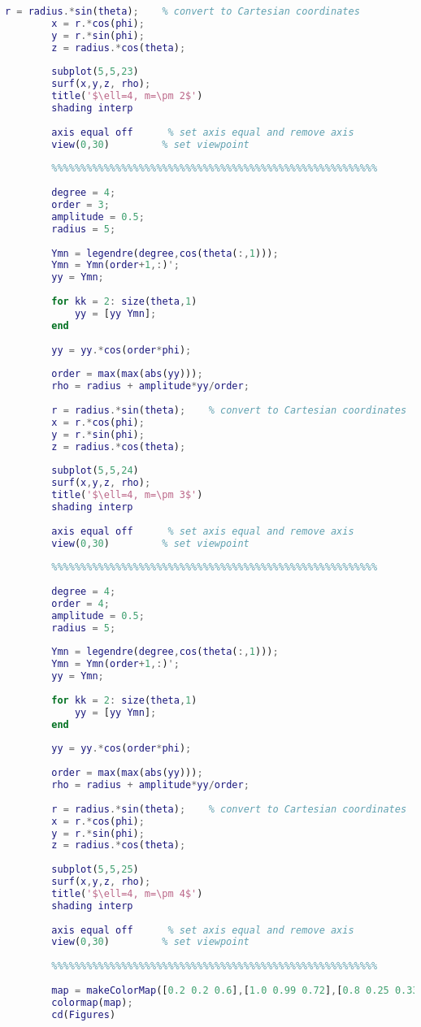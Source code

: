 \begin{lstlisting}[language=MATLAB]
		r = radius.*sin(theta);    % convert to Cartesian coordinates
		x = r.*cos(phi);
		y = r.*sin(phi);
		z = radius.*cos(theta);
		
		subplot(5,5,23)
		surf(x,y,z, rho);
		title('$\ell=4, m=\pm 2$')
		shading interp
		
		axis equal off      % set axis equal and remove axis
		view(0,30)         % set viewpoint
		
		%%%%%%%%%%%%%%%%%%%%%%%%%%%%%%%%%%%%%%%%%%%%%%%%%%%%%%%%
		
		degree = 4;
		order = 3;
		amplitude = 0.5;
		radius = 5;
		
		Ymn = legendre(degree,cos(theta(:,1)));
		Ymn = Ymn(order+1,:)';
		yy = Ymn;
		
		for kk = 2: size(theta,1)
		    yy = [yy Ymn];
		end
		
		yy = yy.*cos(order*phi);
		
		order = max(max(abs(yy)));
		rho = radius + amplitude*yy/order;
		
		r = radius.*sin(theta);    % convert to Cartesian coordinates
		x = r.*cos(phi);
		y = r.*sin(phi);
		z = radius.*cos(theta);
		
		subplot(5,5,24)
		surf(x,y,z, rho);
		title('$\ell=4, m=\pm 3$')
		shading interp
		
		axis equal off      % set axis equal and remove axis
		view(0,30)         % set viewpoint
		
		%%%%%%%%%%%%%%%%%%%%%%%%%%%%%%%%%%%%%%%%%%%%%%%%%%%%%%%%
		
		degree = 4;
		order = 4;
		amplitude = 0.5;
		radius = 5;
		
		Ymn = legendre(degree,cos(theta(:,1)));
		Ymn = Ymn(order+1,:)';
		yy = Ymn;
		
		for kk = 2: size(theta,1)
		    yy = [yy Ymn];
		end
		
		yy = yy.*cos(order*phi);
		
		order = max(max(abs(yy)));
		rho = radius + amplitude*yy/order;
		
		r = radius.*sin(theta);    % convert to Cartesian coordinates
		x = r.*cos(phi);
		y = r.*sin(phi);
		z = radius.*cos(theta);
		
		subplot(5,5,25)
		surf(x,y,z, rho);
		title('$\ell=4, m=\pm 4$')
		shading interp
		
		axis equal off      % set axis equal and remove axis
		view(0,30)         % set viewpoint
		
		%%%%%%%%%%%%%%%%%%%%%%%%%%%%%%%%%%%%%%%%%%%%%%%%%%%%%%%%
		
		map = makeColorMap([0.2 0.2 0.6],[1.0 0.99 0.72],[0.8 0.25 0.33],80);
		colormap(map);
		cd(Figures)
	\end{lstlisting}
	
